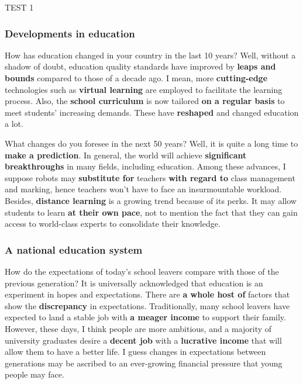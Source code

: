 \documentclass[a4paper,12pt]{article}
\begin{document}
\begin{glossarymc}[Cambridge 3]
\begin{test}{TEST 1}
\subsubsection*{Developments in education}
\begin{qa}{How has education changed in your country in the last 10 years?}
    Well, without a shadow of doubt, education quality standards have improved by \textbf{leaps and bounds} compared to those of a decade ago. 
    I mean, more \textbf{cutting-edge} technologies such as \textbf{virtual learning} are employed to facilitate the learning process. 
    Also, the \textbf{school curriculum} is now tailored \textbf{on a regular basis} to meet students' increasing demands. 
    These have \textbf{reshaped} and changed education a lot.
\end{qa}

\begin{qa}{What changes do you foresee in the next 50 years?}
    Well, it is quite a long time to \textbf{make a prediction}. 
    In general, the world will achieve \textbf{significant breakthroughs} in many fields, including education. 
    Among these advances, I suppose robots may \textbf{substitute for} teachers \textbf{with regard to} class management and marking, hence teachers won't have to face an insurmountable workload. 
    Besides, \textbf{distance learning} is a growing trend because of its perks. 
    It may allow students to learn \textbf{at their own pace}, not to mention the fact that they can gain access to world-class experts to consolidate their knowledge.
\end{qa}

\subsubsection*{A national education system}

\begin{qa}{How do the expectations of today's school leavers compare with those of the previous generation?}
    It is universally acknowledged that education is an experiment in hopes and expectations. 
    There are \textbf{a whole host of} factors that show the \textbf{discrepancy} in expectations. 
    Traditionally, many school leavers have expected to land a stable job with \textbf{a meager income} to support their family. 
    However, these days, I think people are more ambitious, and a majority of university graduates desire a \textbf{decent job} with a \textbf{lucrative income} that will allow them to have a better life. 
    I guess changes in expectations between generations may be ascribed to an ever-growing financial pressure that young people may face.
\end{qa}


\end{test}
\end{glossarymc}
\end{document}
